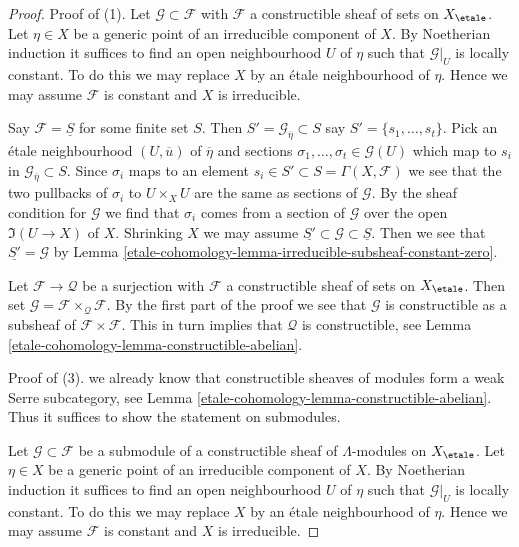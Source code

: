 \begin{proof}
Proof of (1). Let $\mathcal{G} \subset \mathcal{F}$ with $\mathcal{F}$
a constructible sheaf of sets on $X_\etale$. Let $\eta \in X$ be a generic
point of an irreducible component of $X$. By Noetherian induction
it suffices to find an open neighbourhood $U$ of $\eta$ such that
$\mathcal{G}|_U$ is locally constant. To do this we may replace $X$
by an \'etale neighbourhood of $\eta$.
Hence we may assume $\mathcal{F}$ is constant and $X$ is irreducible.

\medskip\noindent
Say $\mathcal{F} = \underline{S}$ for some finite set $S$.
Then $S' = \mathcal{G}_{\overline{\eta}} \subset S$
say $S' = \{s_1, \ldots, s_t\}$.
Pick an \'etale neighbourhood $(U, \overline{u})$ of $\overline{\eta}$
and sections $\sigma_1, \ldots, \sigma_t \in \mathcal{G}(U)$ which map to
$s_i$ in $\mathcal{G}_{\overline{\eta}} \subset S$.
Since $\sigma_i$ maps to an element
$s_i \in S' \subset S = \Gamma(X, \mathcal{F})$
we see that the two pullbacks of $\sigma_i$ to $U \times_X U$
are the same as sections of $\mathcal{G}$. By the sheaf condition
for $\mathcal{G}$ we find that $\sigma_i$ comes from a section
of $\mathcal{G}$ over the open $\Im(U \to X)$ of $X$.
Shrinking $X$ we may assume
$\underline{S'} \subset \mathcal{G} \subset \underline{S}$.
Then we see that $\underline{S'} = \mathcal{G}$ by
Lemma \ref{etale-cohomology-lemma-irreducible-subsheaf-constant-zero}.

\medskip\noindent
Let $\mathcal{F} \to \mathcal{Q}$ be a surjection with $\mathcal{F}$
a constructible sheaf of sets on $X_\etale$. Then set
$\mathcal{G} = \mathcal{F} \times_\mathcal{Q} \mathcal{F}$.
By the first part of the proof we see that $\mathcal{G}$ is
constructible as a subsheaf of $\mathcal{F} \times \mathcal{F}$.
This in turn implies that $\mathcal{Q}$ is constructible, see
Lemma \ref{etale-cohomology-lemma-constructible-abelian}.

\medskip\noindent
Proof of (3). we already know that constructible sheaves of modules
form a weak Serre subcategory, see Lemma \ref{etale-cohomology-lemma-constructible-abelian}.
Thus it suffices to show the statement on submodules.

\medskip\noindent
Let $\mathcal{G} \subset \mathcal{F}$ be a submodule of a
constructible sheaf of $\Lambda$-modules on $X_\etale$. Let $\eta \in X$
be a generic point of an irreducible component of $X$. By Noetherian induction
it suffices to find an open neighbourhood $U$ of $\eta$ such that
$\mathcal{G}|_U$ is locally constant. To do this we may replace $X$
by an \'etale neighbourhood of $\eta$. Hence we may assume $\mathcal{F}$
is constant and $X$ is irreducible.


\end{proof}
